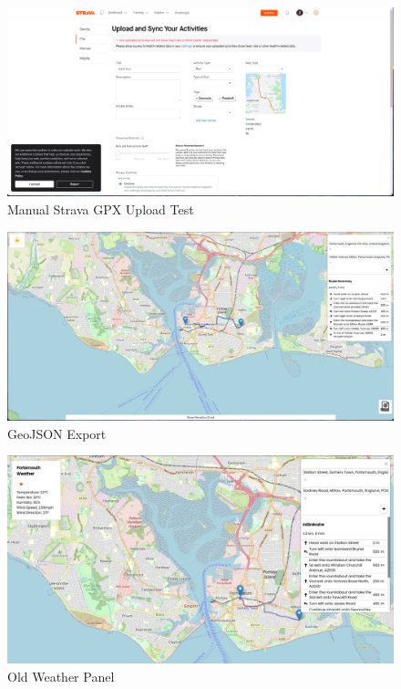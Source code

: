 \begin{figure}[!ht]
    \centering
    \includegraphics[width=425px]{figures/Progress Images/Iteration-1/SR12/SR13 GPX Successful upload Strava (manual).png}
    \caption{Manual Strava GPX Upload Test}
    \label{fig:manual-strava-gpx}
\end{figure}

\begin{figure}[!ht]
    \centering
    \includegraphics[width=425px]{figures/Progress Images/Iteration-1/SR12/SR14 GeoJSON Export.png}
    \caption{GeoJSON Export}
    \label{fig:geojson-export}
\end{figure}

\begin{figure}[!ht]
    \centering
    \includegraphics[width=425px]{figures/Progress Images/Iteration-1/SR19/Basic Weather Panel.png}
    \caption{Old Weather Panel}
    \label{fig:basic-weather-panel2}
\end{figure}

